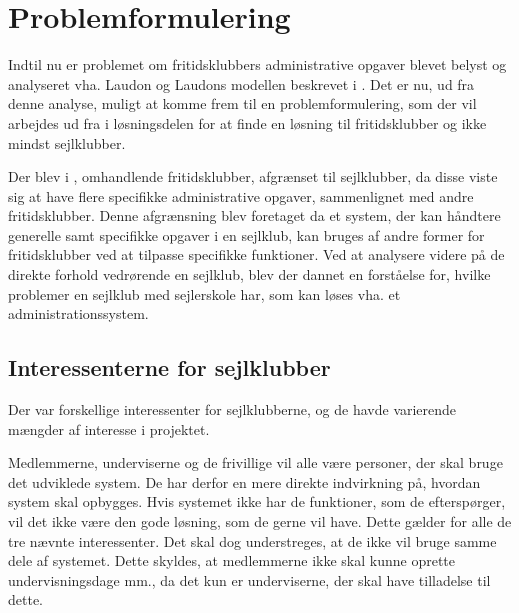 \chapter{Problemformulering}\label{chap:problemformulering-new}

Indtil nu er problemet om fritidsklubbers administrative opgaver blevet belyst og analyseret vha. Laudon og Laudons modellen beskrevet i . 
Det er nu, ud fra denne analyse, muligt at komme frem til en problemformulering, som der vil arbejdes ud fra i løsningsdelen for at finde en løsning til fritidsklubber og ikke mindst sejlklubber.

Der blev i , omhandlende fritidsklubber, afgrænset til sejlklubber, da disse viste sig at have flere specifikke administrative opgaver, sammenlignet med andre fritidsklubber. 
Denne afgrænsning blev foretaget da et system, der kan håndtere generelle samt specifikke opgaver i en sejlklub, kan bruges af andre former for fritidsklubber ved at tilpasse specifikke funktioner.
Ved at analysere videre på de direkte forhold vedrørende en sejlklub, blev der dannet en forståelse for, hvilke problemer en sejlklub med sejlerskole har, som kan løses vha. et administrationssystem.


\section{Interessenterne for sejlklubber}

Der var forskellige interessenter for sejlklubberne, og de havde varierende mængder af interesse i projektet. 

Medlemmerne, underviserne og de frivillige vil alle være personer, der skal bruge det udviklede system. 
De har derfor en mere direkte indvirkning på, hvordan system skal opbygges. 
Hvis systemet ikke har de funktioner, som de efterspørger, vil det ikke være den gode løsning, som de gerne vil have. 
Dette gælder for alle de tre nævnte interessenter. 
Det skal dog understreges, at de ikke vil bruge samme dele af systemet. 
Dette skyldes, at medlemmerne ikke skal kunne oprette undervisningsdage mm., da det kun er underviserne, der skal have tilladelse til dette. 


